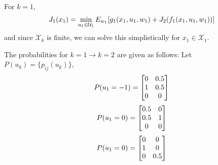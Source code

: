 \documentclass[]{article}
\begin{document}
For $k=1$, \[
    J_1(x_1) = \min_{u_1 \in \mathcal{U}_1} E_{w_1} \qty[g_1(x_1,u_1,w_1) + J_{2}(f_1(x_1,u_1,w_1))]
\] and since $\mathcal{X}_k$ is finite, we can solve this simplistically for $x_1 \in \mathcal{X}_1$.

The probabilities for $k=1 \to k=2$ are given as follows:
Let $P(u_k) = \{p_{ij}(u_k)\}$, \[
    P(u_1 = -1) = \mqty[
        0 & 0.5\\
        1 & 0.5\\
        0 & 0
    ]
\]\[
    P(u_1 = 0) = \mqty[
        0.5 & 0\\
        0.5 & 1\\
        0 & 0
    ]
\]
\[
    P(u_1 = 0) = \mqty[
        0 & 0\\
        1 & 0\\
        0 & 0.5
    ]
\]
\end{document}
